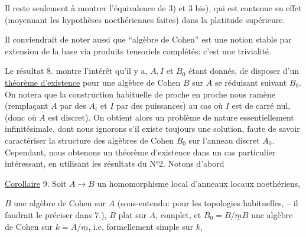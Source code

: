Il reste seulement à montrer l'équivalence de 3) et 3 bis), qui est
contenue en effet (moyennant les hypothèses noethériennes faites) dans
la platitude supérieure.

 Il conviendrait de noter aussi  que ``algèbre de
Cohen'' est une notion stable par extension de la base via produits tensoriels complétés: c'est une trivialité.

Le résultat 8. montre l'intérêt qu'il y a, $A,I$ et $B_0$ étant donnés,
de disposer d'un \uline{théorème d'existence} pour une algèbre de Cohen $B$ sur $A$
se réduisant suivant $B_0$. On notera que la construction habituelle de
proche en proche nous ramène (remplaçant $A$ par des $A_i$
et $I$ par des puissances) au cas où $I$ est de carré nul, (donc où $A$ est
discret). On obtient alors un problème de nature essentiellement infinitésimale,
dont nous ignorons s'il existe toujours une solution, faute de
savoir caractériser la structure des algèbres de Cohen $B_0$ sur l'anneau
discret $A_0$. Cependant, nous obtenons  un théorème d'existence dans
un cas particulier intéressant, en utilisant les résultats du N°2. Notons
d'abord


\uline{Corollaire} 9. Soit $A\longrightarrow B$ un homomorphisme local d'anneaux locaux noethériens,



  $B$  une
algèbre de Cohen sur $A$ (sous-entendu: pour les topologies habituelles,
-- il faudrait le préciser dans 7.),  $B$
 plat sur $A$, complet, et  $B_0=B/\underline{m}B$
 une algèbre de Cohen sur $k=A/\underline{m}$, i.e.
formellement simple sur $k$,


